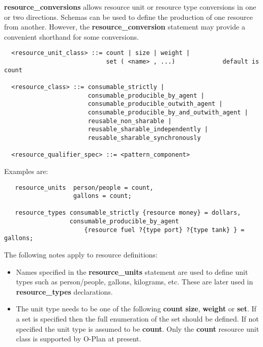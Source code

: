 {\bf resource\_conversions} allows resource unit or resource type conversions
in one or two directions.  Schemas can be used to define the production of one
resource from another.  However, the {\bf resource\_conversion} statement may
provide a convenient shorthand for some conversions.

\begin{verbatim}
  <resource_unit_class> ::= count | size | weight |
                            set ( <name> , ...)             default is count

  <resource_class> ::= consumable_strictly |
                       consumable_producible_by_agent |
                       consumable_producible_outwith_agent |
                       consumable_producible_by_and_outwith_agent |
                       reusable_non_sharable |
                       reusable_sharable_independently |
                       reusable_sharable_synchronously

  <resource_qualifier_spec> ::= <pattern_component>
\end{verbatim}

Examples are:

\begin{verbatim}
   resource_units  person/people = count,
                   gallons = count;

   resource_types consumable_strictly {resource money} = dollars,
                  consumable_producible_by_agent
                      {resource fuel ?{type port} ?{type tank} } = gallons;
\end{verbatim}

The following notes apply to resource definitions:

\begin{itemize}

\item 
Names specified in the {\bf resource\_units}
statement are used to define unit types such as person/people, gallons,
kilograms, etc.  These are later used in {\bf resource\_types}
declarations. 

\item 

The unit type needs to be one of the following {\bf count}
{\bf size}, {\bf weight} or {\bf set}.  If a set is specified then the full
enumeration of the set should be defined.  If not specified the unit type is
assumed to be {\bf count}.  Only the {\bf count} resource unit class is
supported by O-Plan at present.

\end{itemize}

